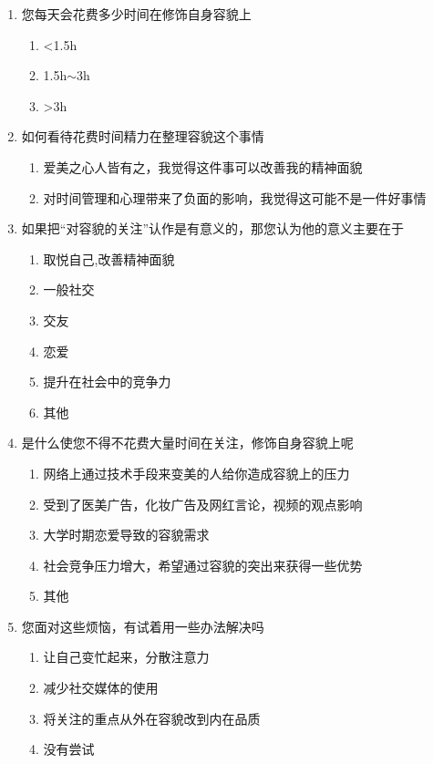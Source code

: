 \begin{enumerate}[label=第\arabic{*}题、, leftmargin=7em]
    \item 您每天会花费多少时间在修饰自身容貌上
    \begin{enumerate}[label=\Alph*.]
        \item <1.5h
        \item 1.5h$\sim $3h
        \item >3h
    \end{enumerate}

    \item 如何看待花费时间精力在整理容貌这个事情
    \begin{enumerate}[label=\Alph*.]
        \item 爱美之心人皆有之，我觉得这件事可以改善我的精神面貌
        \item 对时间管理和心理带来了负面的影响，我觉得这可能不是一件好事情
    \end{enumerate}

    \item 如果把``对容貌的关注''认作是有意义的，那您认为他的意义主要在于
    \begin{enumerate}[label=\Alph*.]
        \item 取悦自己,改善精神面貌
        \item 一般社交
        \item 交友
        \item 恋爱
        \item 提升在社会中的竞争力
        \item 其他
    \end{enumerate}

    \item 是什么使您不得不花费大量时间在关注，修饰自身容貌上呢
    \begin{enumerate}[label=\Alph*.]
        \item 网络上通过技术手段来变美的人给你造成容貌上的压力
        \item 受到了医美广告，化妆广告及网红言论，视频的观点影响
        \item 大学时期恋爱导致的容貌需求
        \item 社会竞争压力增大，希望通过容貌的突出来获得一些优势
        \item 其他
    \end{enumerate}

    \item 您面对这些烦恼，有试着用一些办法解决吗
    \begin{enumerate}[label=\Alph*.]
        \item 让自己变忙起来，分散注意力
        \item 减少社交媒体的使用
        \item 将关注的重点从外在容貌改到内在品质
        \item 没有尝试
    \end{enumerate}


\end{enumerate}
